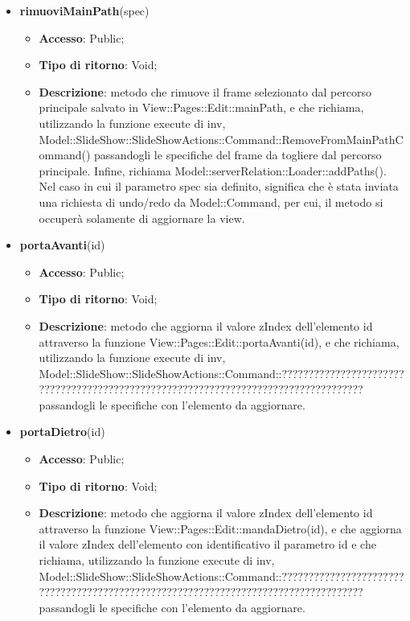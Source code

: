 {{\begin{itemize}
\begin{itemize}
		\end{itemize}
		\item \textbf{rimuoviMainPath}(spec)
		\begin{itemize}
			\item \textbf{Accesso}: Public;
			\item \textbf{Tipo di ritorno}: Void;
			\item \textbf{Descrizione}: metodo che rimuove il frame selezionato dal percorso principale salvato in View::Pages::Edit::mainPath, e che richiama, utilizzando la funzione execute di inv, Model::\-SlideShow::\-SlideShowActions::\-Command::\-RemoveFromMainPathCommand() passandogli le specifiche del frame da togliere dal percorso principale. Infine, richiama Model::\-serverRelation::\-Loader::\-addPaths(). Nel caso in cui il parametro spec sia definito, significa che è stata inviata una richiesta di undo/redo da Model::\-Command, per cui, il metodo si occuperà solamente di aggiornare la view.
		\end{itemize}
		\item \textbf{portaAvanti}(id)
		\begin{itemize}
			\item \textbf{Accesso}: Public;
			\item \textbf{Tipo di ritorno}: Void;
			\item \textbf{Descrizione}: metodo che aggiorna il valore zIndex dell'elemento id attraverso la funzione View::Pages::Edit::portaAvanti(id), e che richiama, utilizzando la funzione execute di inv, Model::\-SlideShow::\-SlideShowActions::\-Command::\-???????????????????????????????????????????????????????????????????????????????????? passandogli le specifiche con l'elemento da aggiornare.
		\end{itemize}
		\item \textbf{portaDietro}(id)
		\begin{itemize}
			\item \textbf{Accesso}: Public;
			\item \textbf{Tipo di ritorno}: Void;
			\item \textbf{Descrizione}: metodo che aggiorna il valore zIndex dell'elemento id attraverso la funzione View::Pages::Edit::mandaDietro(id), e che aggiorna il valore zIndex dell'elemento con identificativo il parametro id e che richiama, utilizzando la funzione execute di inv, Model::\-SlideShow::\-SlideShowActions::\-Command::\-???????????????????????????????????????????????????????????????????????????????????? passandogli le specifiche con l'elemento da aggiornare.

\end{itemize}
\end{itemize}}}
